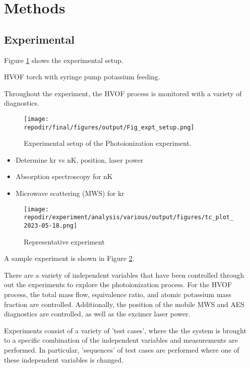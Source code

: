 \section{Methods}


\subsection{Experimental}

Figure \ref{fig:expt_setup} shows the experimental setup. 

HVOF torch with syringe pump potassium feeding. 

Throughout the experiment, the HVOF process is monitored with a variety of diagnostics. 



\begin{figure}[h]
    \texttt{[image: \\repodir/final/figures/output/Fig\_expt\_setup.png]} 
    \caption{Experimental setup of the Photoionization experiment. }
    \label{fig:expt_setup}
\end{figure}

\begin{itemize}
\item Determine kr vs nK, position, laser power
\item Absorption spectroscopy for nK
\item Microwave scattering (MWS) for kr 
\end{itemize}


\begin{figure}[p]
    \texttt{[image: \\repodir/experiment/analysis/various/output/figures/tc\_plot\_2023-05-18.png]} 
    \caption{Representative experiment}
    \label{fig:expt_example}
\end{figure}

A sample experiment is shown in Figure \ref{fig:expt_example}.

There are a variety of independent variables that have been controlled through out the experiments to explore the photoionization process. For the HVOF process, the total mass flow, equivalence ratio, and atomic potassium mass fraction are controlled. Additionally, the position of the mobile MWS and AES diagnostics are controlled, as well as the excimer laser power. 

Experiments consist of a variety of 'test cases', where the the system is brought to a specific combination of the independent variables and measurements are performed. In particular, 'sequences' of test cases are performed where one of these independent variables is changed. 

